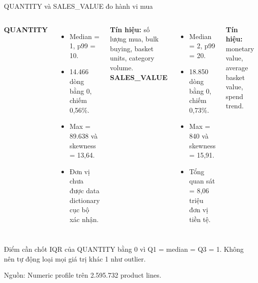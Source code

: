 \documentclass[aspectratio=169,11pt]{beamer}
\newcommand{\src}[1]{\par\vfill{\tiny\color{gray}Nguồn: #1}}
\begin{document}
\begin{frame}{QUANTITY và SALES\_VALUE đo hành vi mua}
\begin{columns}[T]
\textbf{QUANTITY}
\begin{itemize}
\item Median = 1, p99 = 10.
\item 14.466 dòng bằng 0, chiếm 0,56\%.
\item Max = 89.638 và skewness = 13,64.
\item Đơn vị chưa được data dictionary cục bộ xác nhận.
\end{itemize}
\medskip
\textbf{Tín hiệu:} số lượng mua, bulk buying, basket units, category volume.
\textbf{SALES\_VALUE}
\begin{itemize}
\item Median = 2, p99 = 20.
\item 18.850 dòng bằng 0, chiếm 0,73\%.
\item Max = 840 và skewness = 15,91.
\item Tổng quan sát = 8,06 triệu đơn vị tiền tệ.
\end{itemize}
\medskip
\textbf{Tín hiệu:} monetary value, average basket value, spend trend.
\end{columns}
\begin{alertblock}{Điểm cần chốt}
IQR của QUANTITY bằng 0 vì Q1 = median = Q3 = 1. Không nên tự động loại mọi giá trị khác 1 như outlier.
\end{alertblock}
\src{Numeric profile trên 2.595.732 product lines.}
\end{frame}
\end{document}
